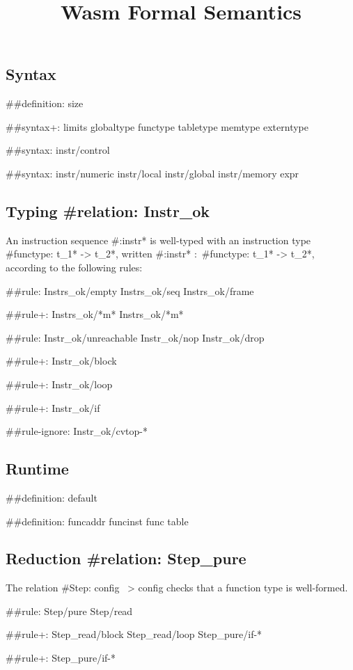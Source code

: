 \documentclass[a4paper]{scrartcl}
\title{Wasm Formal Semantics}
\begin{document}
\small

\maketitle


\subsection*{Syntax}

##{definition: size}

##{syntax+:
  limits
  {globaltype
  functype
  tabletype
  memtype}
  {}
  externtype
}

##{syntax: {instr/control}}

##{syntax: {instr/numeric instr/local instr/global instr/memory} expr}


\subsection*{Typing #{relation: Instr_ok}}

An instruction sequence #{:instr*} is well-typed with an instruction type #{functype: t_1* -> t_2*}, written #{:instr*} $:$ #{functype: t_1* -> t_2*}, according to the following rules:

##{rule:
  {Instrs_ok/empty Instrs_ok/seq}
  {Instrs_ok/frame}
}

##{rule+: Instrs_ok/*m* {Instrs_ok/*m*}}

##{rule: {Instr_ok/unreachable Instr_ok/nop Instr_ok/drop}}

##{rule+: Instr_ok/block}

##{rule+: Instr_ok/loop}

##{rule+: Instr_ok/if}


##{rule-ignore: Instr_ok/cvtop-*}


\subsection*{Runtime}

##{definition: default}

##{definition: {funcaddr funcinst} {func table}}


\subsection*{Reduction #{relation: Step_pure}}

The relation #{Step: config ~> config} checks that a function type is well-formed.

##{rule: Step/pure Step/read}

##{rule+: {Step_read/block Step_read/loop} {Step_pure/if-*}}

##{rule+: Step_pure/if-*}
\end{document}
